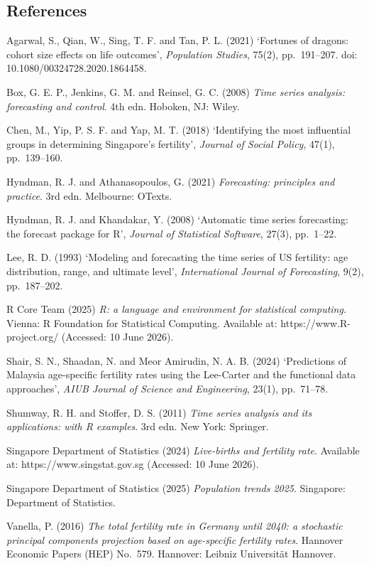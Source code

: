\documentclass[
  11pt,
]{article}
\begin{document}
\subsection{References}\label{references}

Agarwal, S., Qian, W., Sing, T. F. and Tan, P. L. (2021) `Fortunes of
dragons: cohort size effects on life outcomes', \emph{Population
Studies}, 75(2), pp.~191--207. doi: 10.1080/00324728.2020.1864458.

Box, G. E. P., Jenkins, G. M. and Reinsel, G. C. (2008) \emph{Time
series analysis: forecasting and control}. 4th edn. Hoboken, NJ: Wiley.

Chen, M., Yip, P. S. F. and Yap, M. T. (2018) `Identifying the most
influential groups in determining Singapore's fertility', \emph{Journal
of Social Policy}, 47(1), pp.~139--160.

Hyndman, R. J. and Athanasopoulos, G. (2021) \emph{Forecasting:
principles and practice}. 3rd edn. Melbourne: OTexts.

Hyndman, R. J. and Khandakar, Y. (2008) `Automatic time series
forecasting: the forecast package for R', \emph{Journal of Statistical
Software}, 27(3), pp.~1--22.

Lee, R. D. (1993) `Modeling and forecasting the time series of US
fertility: age distribution, range, and ultimate level',
\emph{International Journal of Forecasting}, 9(2), pp.~187--202.

R Core Team (2025) \emph{R: a language and environment for statistical
computing}. Vienna: R Foundation for Statistical Computing. Available
at: https://www.R-project.org/ (Accessed: 10 June 2026).

Shair, S. N., Shaadan, N. and Meor Amirudin, N. A. B. (2024)
`Predictions of Malaysia age-specific fertility rates using the
Lee-Carter and the functional data approaches', \emph{AIUB Journal of
Science and Engineering}, 23(1), pp.~71--78.

Shumway, R. H. and Stoffer, D. S. (2011) \emph{Time series analysis and
its applications: with R examples}. 3rd edn. New York: Springer.

Singapore Department of Statistics (2024) \emph{Live-births and
fertility rate}. Available at: https://www.singstat.gov.sg (Accessed: 10
June 2026).

Singapore Department of Statistics (2025) \emph{Population trends 2025}.
Singapore: Department of Statistics.

Vanella, P. (2016) \emph{The total fertility rate in Germany until 2040:
a stochastic principal components projection based on age-specific
fertility rates}. Hannover Economic Papers (HEP) No.~579. Hannover:
Leibniz Universität Hannover.
\end{document}
